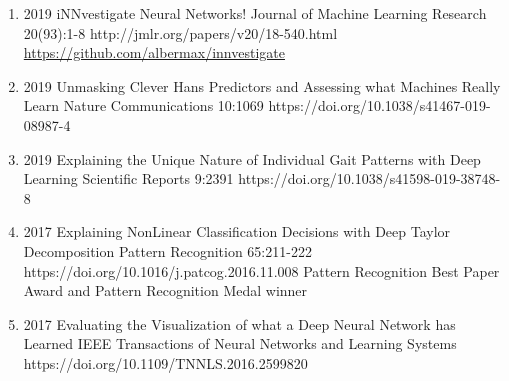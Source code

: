 \documentclass[10pt,a4paper]{article} %
\begin{document}
{\begin{enumerate}
    \item {}
                        {2019}
                        {iNNvestigate Neural Networks!}
                        {Journal of Machine Learning Research}
                        {20(93):1-8}
                        {http://jmlr.org/papers/v20/18-540.html}
                        {\href{https://github.com/albermax/innvestigate}{https://github.com/albermax/innvestigate}}

    \item {}
                        {2019}
                        {Unmasking Clever Hans Predictors and Assessing what Machines Really Learn}
                        {Nature Communications}
                        {10:1069}
                        {https://doi.org/10.1038/s41467-019-08987-4}

    \item {}
                        {2019}
                        {Explaining the Unique Nature of Individual Gait Patterns with Deep Learning}
                        {Scientific Reports}
                        {9:2391}
                        {https://doi.org/10.1038/s41598-019-38748-8}

    \item {}
                            {2017}
                            {Explaining NonLinear Classification Decisions with Deep Taylor Decomposition}
                            {Pattern Recognition}
                            {65:211-222}
                            {https://doi.org/10.1016/j.patcog.2016.11.008}
                            {Pattern Recognition Best Paper Award and Pattern Recognition Medal winner}

    \item {}
                        {2017}
                        {Evaluating the Visualization of what a Deep Neural Network has Learned}
                        {IEEE Transactions of Neural Networks and Learning Systems}
                        {}
                        {https://doi.org/10.1109/TNNLS.2016.2599820}


\end{enumerate}}
\end{document}
